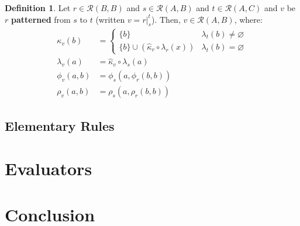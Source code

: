 \documentclass{article}
\theoremstyle{definition}
\newtheorem{definition}{Definition}[subsection]
\theoremstyle{plain}
\def\rule{\mathcal{R}}
\begin{document}
\begin{definition}
  Let $ r \in \rule (B, B) $
  and $ s \in \rule (A, B) $
  and $ t \in \rule (A, C) $
  and $ v $ be $ r $ \textbf{patterned} from $ s $ to $ t $ (written $ v = r \rvert_{s}^{t} $).
  Then, $ v \in \rule (A, B) $, where:
  \begin{align}
      \kappa_v (b) & = \begin{cases}
                         \{ b \}                                            & \lambda_t (b) \neq \varnothing \\
                         \{ b \} \cup (\widehat{\kappa}_v \circ \lambda_r (x)) & \lambda_t (b) =    \varnothing
                       \end{cases} \\
  \lambda_v (a)    & = \widehat{\kappa}_v \circ \lambda_s (a) \\
     \phi_v (a, b) & = \phi_s (a, \phi_r (b, b)) \\
     \rho_v (a, b) & = \rho_s (a, \rho_r (b, b)) 
  \end{align}
\end{definition}

\subsection{Elementary Rules}

\section{Evaluators}

\section{Conclusion}
\end{document}
